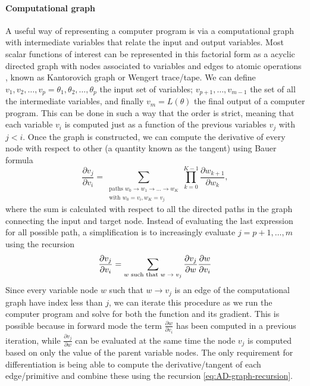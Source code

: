 \paragraph{Computational graph}

A useful way of representing a computer program is via a computational graph with intermediate variables that relate the input and output variables. 
Most scalar functions of interest can be represented in this factorial form as a acyclic directed graph with nodes associated to variables and edges to atomic operations \cite{griewank2008evaluatingderivatives, Griewack-on-AD}, known as Kantorovich graph \cite{kantorovich1957mathematical} or Wengert trace/tape\cite{Wengert_1964, Bauer_1974}. 
We can define $v_1, v_2, \ldots, v_p = \theta_1, \theta_2, \ldots, \theta_p$ the input set of variables; $v_{p+1}, \ldots, v_{m-1}$ the set of all the intermediate variables, and finally $v_m = L(\theta)$ the final output of a computer program. 
This can be done in such a way that the order is strict, meaning that each variable $v_i$ is computed just as a function of the previous variables $v_j$ with $j < i$. 
Once the graph is constructed, we can compute the derivative of every node with respect to other (a quantity known as the tangent) using Bauer formula \cite{Bauer_1974, Oktay_randomized-AD}
\begin{equation}
    \frac{\partial v_j}{\partial v_i}
    = 
    \sum_{\substack{ \text{paths }w_0 \rightarrow w_1 \rightarrow \ldots \rightarrow w_K \\
                    \text{with } w_0=v_i, w_K = v_j}}
    \prod_{k=0}^{K-1} \frac{\partial w_{k+1}}{\partial w_{k}},
\end{equation}
where the sum is calculated with respect to all the directed paths in the graph connecting the input and target node.
Instead of evaluating the last expression for all possible path, a simplification is to increasingly evaluate $j=p+1, \ldots, m$ using the recursion 
\begin{equation}
    \frac{\partial v_j}{\partial v_i}
    = 
    \sum_\text{$w$\text{ such that} $w \rightarrow v_j$}
    \frac{\partial v_j}{\partial w}
    \frac{\partial w}{\partial v_i} 
    \label{eq:AD-graph-recursion}
\end{equation}
Since every variable node $w$ such that $w \rightarrow v_j$ is an edge of the computational graph have index less than $j$, we can iterate this procedure as we run the computer program and solve for both the function and its gradient.
This is possible because in forward mode the term $\frac{\partial w}{\partial v_i}$ has been computed in a previous iteration, while $\frac{\partial v_j}{\partial w}$ can be evaluated at the same time the node $v_j$ is computed based on only the value of the parent variable nodes. 
The only requirement for differentiation is being able to compute the derivative/tangent of each edge/primitive and combine these using the recursion \eqref{eq:AD-graph-recursion}.

